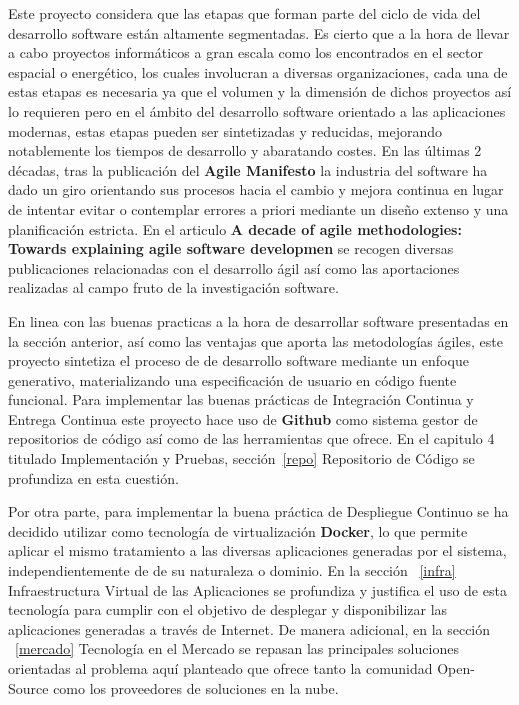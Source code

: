 \documentclass[a4paper,11pt]{book}
\begin{document}
Este proyecto considera que las etapas que forman parte del ciclo de vida del desarrollo software están altamente segmentadas. Es cierto que a la hora de llevar a cabo proyectos informáticos a gran escala como los encontrados en el sector espacial o energético, los cuales involucran a diversas organizaciones,  cada una de estas etapas es necesaria ya que el volumen y la dimensión de dichos proyectos así lo requieren pero en el ámbito del desarrollo software orientado a las aplicaciones modernas, estas etapas pueden ser sintetizadas y reducidas, mejorando notablemente los tiempos de desarrollo y abaratando costes.  En las últimas 2 décadas, tras la publicación del \textbf{ Agile Manifesto}\cite{agile} la industria del software ha dado un giro orientando sus procesos hacia el cambio y mejora continua en lugar de intentar evitar o contemplar errores a priori mediante un diseño extenso y una planificación estricta.  En el articulo \textbf{ A decade of agile methodologies: Towards explaining agile software developmen}\cite{decada} se recogen  diversas publicaciones relacionadas con el desarrollo ágil así como las aportaciones realizadas al campo fruto de la investigación software. 


En linea con las buenas practicas a la hora de desarrollar software presentadas en la sección anterior,  así como las ventajas que aporta las metodologías ágiles, este proyecto sintetiza el proceso de de desarrollo software mediante un enfoque generativo, materializando una especificación de usuario en código fuente funcional.  Para implementar las buenas prácticas de Integración Continua y Entrega Continua este proyecto hace uso de \textbf{Github}\cite{github} como sistema gestor de repositorios de código así como de las herramientas que ofrece. En el capitulo 4 titulado Implementación y Pruebas, sección~\ref{repo}  Repositorio de Código se profundiza en esta cuestión. 

Por otra parte, para implementar la buena práctica de Despliegue Continuo se ha decidido utilizar como tecnología de virtualización  \textbf{Docker}\cite{dk}, lo que permite aplicar el mismo tratamiento a las diversas aplicaciones generadas por el sistema, independientemente de de su naturaleza o dominio. En la sección ~\ref{infra} 
Infraestructura Virtual de las Aplicaciones se profundiza y justifica el uso de esta tecnología para cumplir con el objetivo de desplegar y disponibilizar las aplicaciones generadas a través de Internet. De manera adicional, en la sección ~\ref{mercado} Tecnología en el Mercado se repasan las principales soluciones orientadas al problema aquí planteado que ofrece tanto la comunidad Open-Source como los proveedores de soluciones en la nube.   
\end{document}

